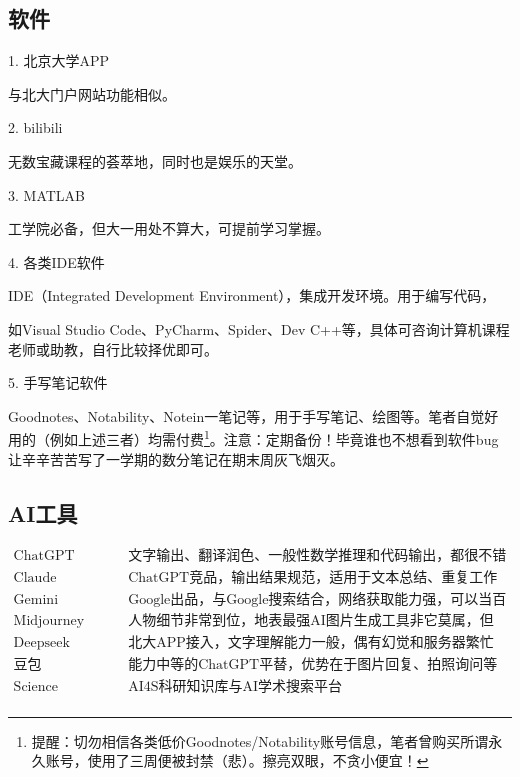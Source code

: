 \subsection{软件}

1. 北京大学APP

与北大门户网站功能相似。

\vspace{10pt}

2. bilibili

无数宝藏课程的荟萃地，同时也是娱乐的天堂。

\vspace{10pt}

3. MATLAB

工学院必备，但大一用处不算大，可提前学习掌握。

\vspace{10pt}

4. 各类IDE软件

IDE（Integrated Development Environment），集成开发环境。用于编写代码，

如Visual Studio Code、PyCharm、Spider、Dev C++等，具体可咨询计算机课程老师或助教，自行比较择优即可。

\vspace{10pt}

5. 手写笔记软件

Goodnotes、Notability、Notein一笔记等，用于手写笔记、绘图等。笔者自觉好用的（例如上述三者）均需付费\footnote{提醒：切勿相信各类低价Goodnotes/Notability账号信息，笔者曾购买所谓永久账号，使用了三周便被封禁（悲）。擦亮双眼，不贪小便宜！}。注意：定期备份！毕竟谁也不想看到软件bug让辛辛苦苦写了一学期的数分笔记在期末周灰飞烟灭。

\subsection{AI工具}

\[
\begin{matrix}
	\text{ChatGPT} & \text{文字输出、翻译润色、一般性数学推理和代码输出，都很不错}\\
	\text{Claude} & \text{ChatGPT竞品，输出结果规范，适用于文本总结、重复工作等}\\
	\text{Gemini} & \text{Google出品，与Google搜索结合，网络获取能力强，可以当百度用}\\
	\text{Midjourney} & \text{人物细节非常到位，地表最强AI图片生成工具非它莫属，但收费（悲）}\\
	\text{Deepseek} & \text{北大APP接入，文字理解能力一般，偶有幻觉和服务器繁忙}\\
	\text{豆包} & \text{能力中等的ChatGPT平替，优势在于图片回复、拍照询问等功能无限制}\\
	\text{Science Navigator} & \text{AI4S科研知识库与AI学术搜索平台}\\
\end{matrix}
\]

